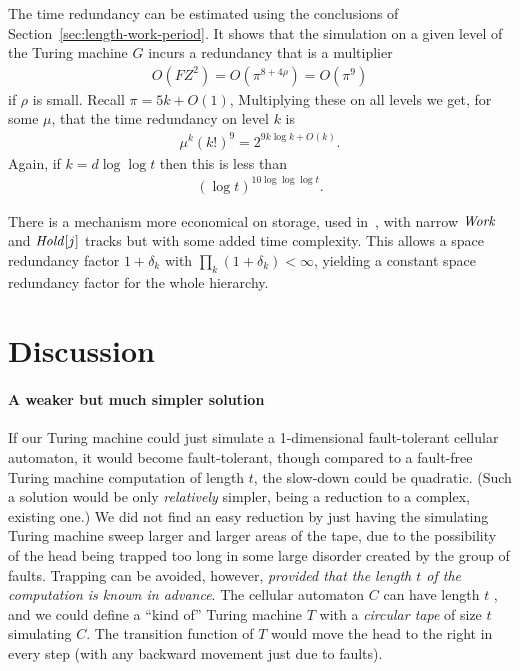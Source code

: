 \documentclass[11pt]{memoir}
\theoremstyle{definition} %
\newcommand{\fld}[1]{\ensuremath{\textit{#1\/}}}
\newcommand{\F}{F}
\newcommand{\passno}{\pi}
\newcommand{\Z}{Z} %
\newcommand{\Hold}{\fld{Hold}}
\newcommand{\Work}{\fld{Work}} %
\begin{document}
The time redundancy can be estimated using the conclusions of Section~\ref{sec:length-work-period}.
It shows that the simulation on a given level of the Turing machine \( G \) incurs a redundancy that
is a multiplier
\begin{align*}
 O(\F\Z^{2}) = O(\passno^{8 + 4\rho})=O(\passno^{9})
\end{align*}
if \( \rho \) is small.
Recall \( \passno=5 k + O(1) \),
Multiplying these on all levels we get, for some \( \mu \), that the time redundancy on level \( k \) is
\begin{align*}
   \mu^{k}(k!)^{9}=2^{9k\log k+O(k)}.
\end{align*}
Again, if \( k=d\log\log t \) then this is less than
\begin{align*}
 (\log t)^{10\log\log\log t}.
 \end{align*}

\begin{remark}
  There is a mechanism more economical on storage, used in~\cite{GacsSorg01},
  with narrow \( \Work \) and \( \Hold[j] \) tracks but with some added time complexity.
  This allows a space redundancy factor \( 1+\delta_{k} \) with \( \prod_{k}(1+\delta_{k})<\infty \),
  yielding a constant space redundancy factor for the whole hierarchy.
\end{remark}


 \section{Discussion}

\paragraph{A weaker but much simpler solution}
If our Turing machine could just simulate a 1-dimensional
fault-tolerant cellular automaton, it would become
fault-tolerant, though compared to a fault-free Turing machine computation of length \( t \),
the slow-down could be quadratic.
(Such a solution would be only \emph{relatively} simpler, being a reduction to a complex, existing one.)
We did not find an easy reduction by just having the simulating
Turing machine sweep larger and larger
areas of the tape, due to the possibility of the head being trapped too long in some large disorder created by
the group of faults.
Trapping can be avoided, however, 
\emph{provided that the length \( t \) of the computation is known in advance}.
The cellular automaton \( C \) can have length \( t \) , and we could define
a ``kind of'' Turing machine \( T \) with a \emph{circular tape} of size \( t \) simulating \( C \).
The transition function of \( T \) would move the head to the right in every step
(with any backward movement just due to faults).
\end{document}
